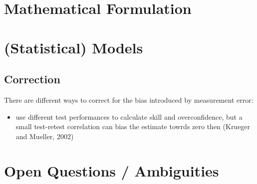 \documentclass[a4paper,11pt]{article}
\newcommand{\1}{\mathbf{1}}
\begin{document}
\section{Mathematical Formulation}

\section{(Statistical) Models}


\subsection{Correction}
There are different ways to correct for the bias introduced by measurement error:
\begin{itemize}
 \item use different test performances to calculate skill and overconfidence, but a small test-retest correlation can bias the estimate towrds zero then (Krueger and Mueller, 2002)
\end{itemize}


\section{Open Questions / Ambiguities}
\end{document}
